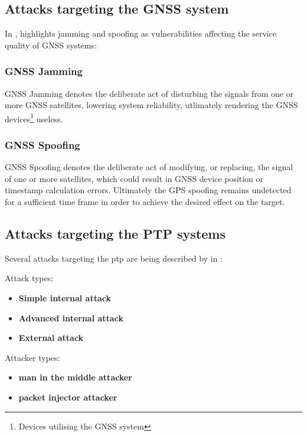  


 
\subsection{Attacks targeting the GNSS system}

In \cite{schmidt2016survey}, \citeauthor{schmidt2016survey} highlights jamming and spoofing as vulnerabilities affecting the service quality of GNSS systems:


\subsubsection{GNSS Jamming}
GNSS Jamming denotes the deliberate act of disturbing the signals from one or more GNSS satellites, lowering system reliability, utlimately rendering the GNSS devices\footnote{Devices utilising the GNSS system} useless. 
\subsubsection{GNSS Spoofing} 
GNSS Spoofing denotes the deliberate act of modifying, or replacing, the signal of one or more satellites, which could result in GNSS device position or timestamp calculation errors. Ultimately the GPS spoofing remains undetected for a sufficient time frame in order to achieve the desired effect on the target.



\subsection{Attacks targeting the PTP systems}


Several attacks targeting the \acrlong{ptp} are being described by \citeauthor{alghamdi2021precision} in \cite{alghamdi2021precision}:









Attack types:
\begin{itemize}
    \item \textbf{Simple internal attack}  
    \item \textbf{Advanced internal attack}
    \item \textbf{External attack} 
\end{itemize}

Attacker types:
\begin{itemize}
    \item \textbf{man in the middle attacker}  
    \item \textbf{packet injector attacker}
\end{itemize}


